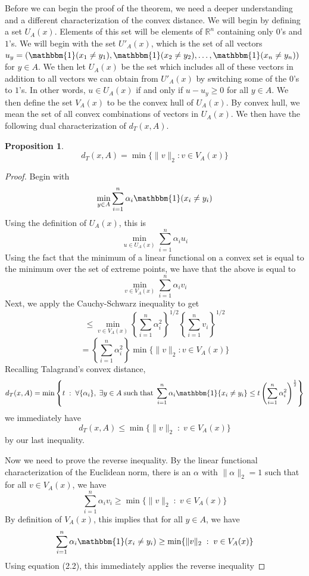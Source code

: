 \documentclass[12pt]{report}
\newtheorem{prop}[thm]{Proposition}
\theoremstyle{definition}
\begin{document}
Before we can begin the proof of the theorem, we need a deeper understanding and a different characterization of the convex distance.  We will begin by defining a set $U_A(x)$.  Elements of this set will be elements of $\mathbb{R}^n$ containing only $0$'s and $1$'s.  We will begin with the set $U'_A(x)$, which is the set of all vectors $u_y=(\mathbbm{1}(x_1\not= y_1), \mathbbm{1}(x_2\not = y_2),\dots ,\mathbbm{1}(x_n\not = y_n))$ for $y\in A$.  We then let $U_A(x)$ be the set which includes all of these vectors in addition to all vectors we can obtain from $U'_A(x)$ by switching some of the $0$'s to $1$'s.  In other words, $u\in U_A(x)$ if and only if $u-u_y\geq 0$ for all $y\in A$.  We then define the set $V_A(x)$ to be the convex hull of $U_A(x)$.  By convex hull, we mean the set of all convex combinations of vectors in $U_A(x)$.  We then have the following dual characterization of $d_T(x,A)$.
\begin{prop}
$$
d_T(x,A)=\min\{\|v\|_2: v\in V_A(x)\}
$$
\end{prop}
\begin{proof}
Begin with 
$$
\min_{y\in A}\sum_{i=1}^n \alpha_i\mathbbm{1}(x_i\not = y_i)
$$
Using the definition of $U_A(x)$, this is 
$$
\min_{u\in U_A(x)} \sum_{i=1}^n\alpha_i u_i
$$
Using the fact that the minimum of a linear functional on a convex set is equal to the minimum over the set of extreme points, we have that the above is equal to  
$$
\min_{v\in V_A(x)}\sum_{i=1}^n\alpha_i v_i
$$
Next, we apply the Cauchy-Schwarz inequality to get
$$
\leq \min_{v\in V_A(x)}\left\{\sum_{i=1}^n\alpha_i^2\right\}^{1/2}\left\{\sum_{i=1}^n v_i\right\}^{1/2}
$$
$$
=\left\{\sum_{i=1}^n\alpha_i ^2\right\} \min \{\|v\|_2: v\in V_A(x)\}
$$
Recalling Talagrand's convex distance, 
$$
d_T(x,A)=\min\left\{ t \; : \;\forall \{\alpha_i\}, \;\exists y\in A \;\mathrm{such}\;\mathrm{that}\; \sum_{i=1}^n \alpha_i
\mathbbm{1}\{x_i\not = y_i\}\leq t\left(\sum_{i=1}^n \alpha_i ^2 \right)^{\frac{1}{2}}\right\}
$$
we immediately have 
$$
d_T(x,A)\leq\min \{\|v\|_2\; : \;v\in V_A(x)\}
$$
by our last inequality.

Now we need to prove the reverse inequality.  
By the linear functional characterization of the Euclidean norm, there is an $\alpha$ with $\|\alpha\|_2=1$ such that for all $v\in V_A(x)$, we have 
$$
\sum_{i=1}^n\alpha_i v_i \geq \min \{\|v\|_2\; : \;v\in V_A(x)\}
$$
By definition of $V_A(x)$, this implies that for all $y\in A$, we have 
$$
\sum_{i=1}^n\alpha_i \mathbbm{1}(x_i\not = y_i)\geq \min \{\|v\|_2\; : \;v\in V_A(x)\}
$$
Using equation (2.2), this immediately applies the reverse inequality

\end{proof}
\end{document}
